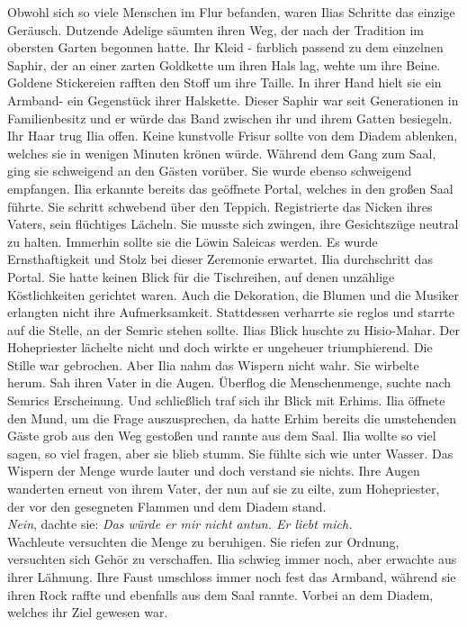 Obwohl sich so viele Menschen im Flur befanden, waren Ilias Schritte das einzige Geräusch. Dutzende 
Adelige säumten ihren Weg, der nach der Tradition im obersten Garten begonnen hatte. Ihr Kleid - 
farblich passend zu dem einzelnen Saphir, der an einer zarten Goldkette um ihren Hals lag, wehte um 
ihre Beine. Goldene Stickereien rafften den Stoff um ihre Taille. In ihrer Hand hielt sie ein 
Armband- ein Gegenstück ihrer Halskette. Dieser Saphir war seit Generationen in Familienbesitz 
und er würde das Band zwischen ihr und ihrem Gatten besiegeln. Ihr Haar trug Ilia offen. Keine 
kunstvolle Frisur sollte von dem Diadem ablenken, welches sie in wenigen Minuten krönen würde. 
Während dem Gang zum Saal, ging sie schweigend an den Gästen vorüber. Sie wurde ebenso schweigend 
empfangen. Ilia erkannte bereits das geöffnete Portal, welches in den großen Saal führte. Sie 
schritt schwebend über den Teppich. Registrierte das Nicken ihres Vaters, sein flüchtiges Lächeln. 
Sie musste sich zwingen, ihre Gesichtszüge neutral zu halten. Immerhin sollte sie die Löwin 
Saleicas werden. Es wurde Ernsthaftigkeit und Stolz bei dieser Zeremonie erwartet. Ilia 
durchschritt das Portal. Sie hatte keinen Blick für die Tischreihen, auf denen unzählige 
Köstlichkeiten gerichtet waren. Auch die Dekoration, die Blumen und die Musiker erlangten nicht 
ihre Aufmerksamkeit. Stattdessen verharrte sie reglos und starrte auf die Stelle, an der Semric 
stehen sollte. Ilias Blick huschte zu Hisio-Mahar. Der Hohepriester lächelte nicht und doch wirkte 
er ungeheuer triumphierend. Die Stille war gebrochen. Aber Ilia nahm das Wispern nicht wahr. Sie 
wirbelte herum. Sah ihren Vater in die Augen. Überflog die Menschenmenge, suchte nach Semrics 
Erscheinung. Und schließlich traf sich ihr Blick mit Erhims. Ilia öffnete den Mund, um die Frage 
auszusprechen, da hatte Erhim bereits die umstehenden Gäste grob aus den Weg gestoßen und rannte 
aus dem Saal. Ilia wollte so viel sagen, so viel fragen, aber sie blieb stumm. Sie fühlte sich wie 
unter Wasser. Das Wispern der Menge wurde lauter und doch verstand sie nichts. Ihre Augen wanderten 
erneut von ihrem Vater, der nun auf sie zu eilte, zum Hohepriester, der vor den gesegneten Flammen 
und dem Diadem stand. \\
\textit{Nein}, dachte sie: \textit{Das würde er mir nicht antun. Er liebt mich.}\\
Wachleute versuchten die Menge zu beruhigen. Sie riefen zur Ordnung, versuchten sich Gehör zu 
verschaffen. Ilia schwieg immer noch, aber erwachte aus ihrer Lähmung. Ihre Faust umschloss immer 
noch fest das Armband, während sie ihren Rock raffte und ebenfalls aus dem Saal rannte. Vorbei an 
dem Diadem, welches ihr Ziel gewesen war.\\

